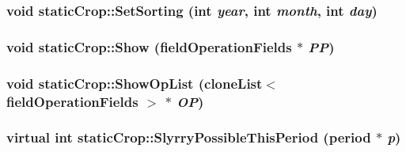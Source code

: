 \label{classstatic_crop_af985797e339d5fe9a653f683b55c125a}
\hypertarget{classstatic_crop_aa6a248194baae477b06a0e234693e3c6}{
\subsubsection[{SetSorting}]{\setlength{\rightskip}{0pt plus 5cm}void staticCrop::SetSorting (int {\em year}, \/  int {\em month}, \/  int {\em day})}}
\label{classstatic_crop_aa6a248194baae477b06a0e234693e3c6}
\hypertarget{classstatic_crop_acd932ec9d52178e685bc647d7a66a038}{
\subsubsection[{Show}]{\setlength{\rightskip}{0pt plus 5cm}void staticCrop::Show ({\bf fieldOperationFields} $\ast$ {\em PP})}}
\label{classstatic_crop_acd932ec9d52178e685bc647d7a66a038}
\hypertarget{classstatic_crop_abfd60fc40149362ff07872a4258f39ec}{
\subsubsection[{ShowOpList}]{\setlength{\rightskip}{0pt plus 5cm}void staticCrop::ShowOpList ({\bf cloneList}$<$ {\bf fieldOperationFields} $>$ $\ast$ {\em OP})}}
\label{classstatic_crop_abfd60fc40149362ff07872a4258f39ec}
\hypertarget{classstatic_crop_ada7c8c797de629277a5ba0b0a4a3c17e}{
\subsubsection[{SlyrryPossibleThisPeriod}]{\setlength{\rightskip}{0pt plus 5cm}virtual int staticCrop::SlyrryPossibleThisPeriod ({\bf period} $\ast$ {\em p})}}
\label{classstatic_crop_ada7c8c797de629277a5ba0b0a4a3c17e}


